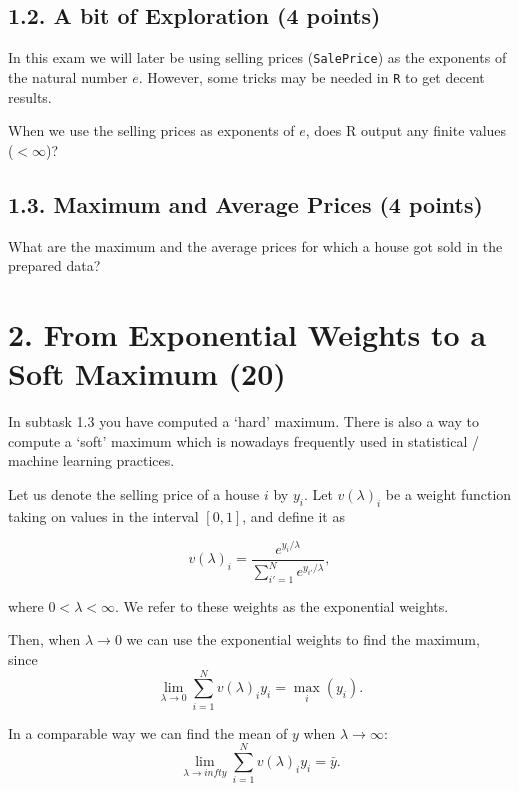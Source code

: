 \documentclass[]{article}
\begin{document}
\subsection{1.2. A bit of Exploration (4
points)}\label{a-bit-of-exploration-4-points}

In this exam we will later be using selling prices (\texttt{SalePrice})
as the exponents of the natural number \(e\). However, some tricks may
be needed in \texttt{R} to get decent results.

When we use the selling prices as exponents of \(e\), does R output any
finite values (\(<\infty\))?

\subsection{1.3. Maximum and Average Prices (4
points)}\label{maximum-and-average-prices-4-points}

What are the maximum and the average prices for which a house got sold
in the prepared data?

\newpage 

\section{2. From Exponential Weights to a Soft Maximum
(20)}\label{from-exponential-weights-to-a-soft-maximum-20}

In subtask 1.3 you have computed a `hard' maximum. There is also a way
to compute a `soft' maximum which is nowadays frequently used in
statistical / machine learning practices.

Let us denote the selling price of a house \(i\) by \(y_i\). Let
\(v( \lambda)_i\) be a weight function taking on values in the interval
\([0,1]\), and define it as

\begin{equation} \label{eq:softmax1}
v(\lambda)_i = \frac{e^{y_i / \lambda}}{\sum_{i' = 1}^N e^{y_{i'} / \lambda}},
\end{equation}

where \(0 < \lambda < \infty\). We refer to these weights as the
exponential weights.

Then, when \(\lambda \to 0\) we can use the exponential weights to find
the maximum, since \[
\lim_{\lambda \to 0} \sum^{N}_{i = 1} v(\lambda)_i y_i = \max_i ( y_i ).
\]

In a comparable way we can find the mean of \(y\) when
\(\lambda \to \infty\): \[
\lim_{\lambda \to infty} \sum^{N}_{i = 1} v(\lambda)_i y_i = \bar{y}.
\]
\end{document}
